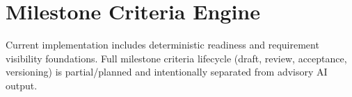 \section{Milestone Criteria Engine}
Current implementation includes deterministic readiness and requirement visibility foundations. Full milestone criteria lifecycle (draft, review, acceptance, versioning) is partial/planned and intentionally separated from advisory AI output.

